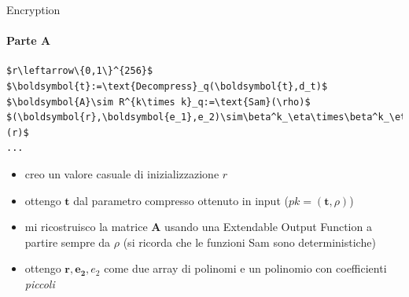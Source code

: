 \begin{frame}[fragile]{Encryption}
    \framesubtitle{Parte A}
    \begin{minipage}{0.45\linewidth}
        \begin{lstlisting}[title=Kyber.CPA.Enc(pk\,m):,mathescape=true]
$r\leftarrow\{0,1\}^{256}$
$\boldsymbol{t}:=\text{Decompress}_q(\boldsymbol{t},d_t)$
$\boldsymbol{A}\sim R^{k\times k}_q:=\text{Sam}(\rho)$
$(\boldsymbol{r},\boldsymbol{e_1},e_2)\sim\beta^k_\eta\times\beta^k_\eta\times\beta_\eta:=\text{Sam}(r)$
...
        \end{lstlisting}
    \end{minipage}\hfill
    \begin{minipage}{0.5\linewidth}
        \begin{itemize}%
            \item creo un valore casuale di inizializzazione $r$
            \item ottengo $\boldsymbol{t}$ dal parametro compresso ottenuto in input ($pk=(\boldsymbol{t},\rho)$)
            \item mi ricostruisco la matrice $\boldsymbol{A}$ usando una Extendable Output Function a partire sempre da $\rho$ (si ricorda che le funzioni Sam sono deterministiche)
            \item ottengo $\boldsymbol{r},\boldsymbol{e_2},e_2$ come due array di polinomi e un polinomio con coefficienti \textit{piccoli}

        \end{itemize}
    \end{minipage}
\end{frame}

